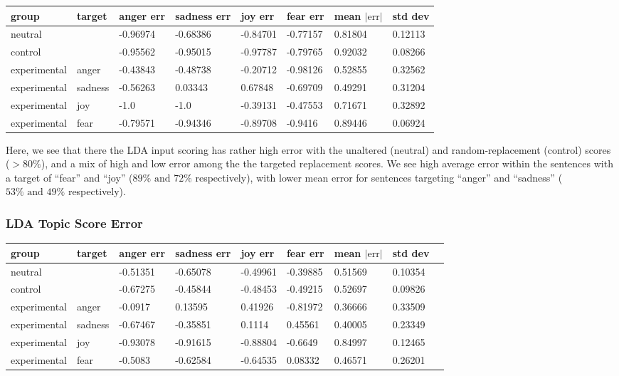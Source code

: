 \documentclass[11pt, twoside, reqno]{book}
\begin{document}
\begin{table}[h!]
    \raggedright
    \begin{tabular}{|l|l|l|l|l|l|l|l|}
    \hline
        group & target & anger err & sadness err & joy err & fear err & mean $|\text{err}|$ & std dev \\ \hline
        neutral &  & -0.96974 & -0.68386 & -0.84701 & -0.77157 & 0.81804 & 0.12113 \\ \hline
        control &  & -0.95562 & -0.95015 & -0.97787 & -0.79765 & 0.92032 & 0.08266 \\ \hline
        experimental & anger & -0.43843 & -0.48738 & -0.20712 & -0.98126 & 0.52855 & 0.32562 \\ \hline
        experimental & sadness & -0.56263 & 0.03343 & 0.67848 & -0.69709 & 0.49291 & 0.31204 \\ \hline
        experimental & joy & -1.0 & -1.0 & -0.39131 & -0.47553 & 0.71671 & 0.32892 \\ \hline
        experimental & fear & -0.79571 & -0.94346 & -0.89708 & -0.9416 & 0.89446 & 0.06924 \\ \hline
    \end{tabular}
\end{table}

Here, we see that there the LDA input scoring has rather high error with the unaltered (neutral) and random-replacement (control) scores ($>80\%$), and a mix of high and low error among the the targeted replacement scores. We see high average error within the sentences with a target of ``fear'' and ``joy'' ($89\% \text{ and } 72\%$ respectively), with lower mean error for sentences targeting ``anger'' and ``sadness'' ($53\% \text{ and } 49\%$ respectively).

\subsubsection{\textbf{LDA Topic Score Error}}

\begin{table}[h!]
    \raggedright
    \begin{tabular}{|l|l|l|l|l|l|l|l|l|}
    \hline
        group & target & anger err & sadness err & joy err & fear err & mean $|\text{err}|$ & std dev  \\ \hline
        neutral &  & -0.51351 & -0.65078 & -0.49961 & -0.39885 & 0.51569 & 0.10354  \\ \hline
        control &  & -0.67275 & -0.45844 & -0.48453 & -0.49215 & 0.52697 & 0.09826  \\ \hline
        experimental & anger & -0.0917 & 0.13595 & 0.41926 & -0.81972 & 0.36666 & 0.33509  \\ \hline
        experimental & sadness & -0.67467 & -0.35851 & 0.1114 & 0.45561 & 0.40005 & 0.23349  \\ \hline
        experimental & joy & -0.93078 & -0.91615 & -0.88804 & -0.6649 & 0.84997 & 0.12465  \\ \hline
        experimental & fear & -0.5083 & -0.62584 & -0.64535 & 0.08332 & 0.46571 & 0.26201  \\ \hline
    \end{tabular}
\end{table}
\end{document}
